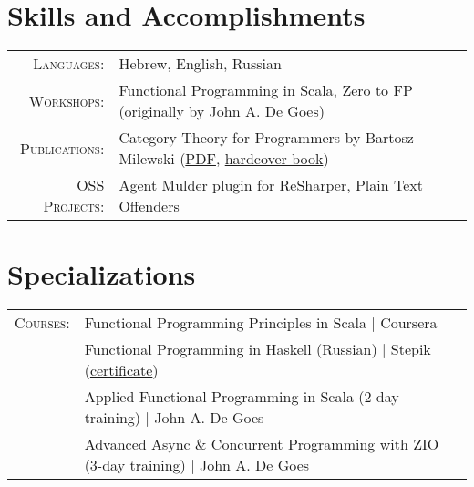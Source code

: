 \documentclass[a4paper,11pt]{article}
\begin{document}
\section{Skills and Accomplishments}
\begin{tabular}{rl}
    \textsc{Languages:}& Hebrew, English, Russian\\
    \textsc{Workshops:}& Functional Programming in Scala, Zero to FP (originally by John A. De Goes)\\
    \textsc{Publications:}& Category Theory for Programmers by Bartosz Milewski (\href{https://github.com/hmemcpy/milewski-ctfp-pdf}{PDF}, \href{https://www.blurb.com/b/9621951-category-theory-for-programmers-new-edition-hardco}{hardcover book})\\
    \textsc{OSS Projects:}& Agent Mulder plugin for ReSharper, Plain Text Offenders\\
\end{tabular}

\section{Specializations}
\begin{tabular}{rl}
  \textsc{Courses:}
  &Functional Programming Principles in Scala | Coursera\\
  &Functional Programming in Haskell (Russian) | Stepik (\href{https://stepik.org/cert/53556}{certificate})\\
  &Applied Functional Programming in Scala (2-day training) | John A. De Goes\\
  &Advanced Async \& Concurrent Programming with ZIO (3-day training) | John A. De Goes
\end{tabular}
\end{document}

